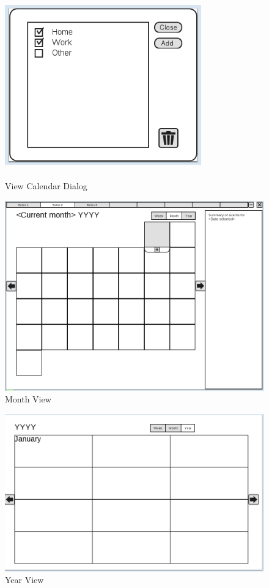 \documentclass{article}
\begin{document}
\begin{figure}
\centering
\includegraphics[height=8cm,width=8.5cm]{CMCLGDRViewCalendar.png}
\caption{View Calendar Dialog}
\label{fig:viewcal}
\end{figure}

\begin{figure}
\centering
\includegraphics[scale=0.5,angle=90]{CMCLGDRMonth.png}
\caption{Month View}
\label{fig:monthview}
\end{figure}

\begin{figure}
\centering
\includegraphics[scale=0.5,angle=90]{CMCLGDRYear.png}
\caption{Year View}
\label{fig:yearrview}
\end{figure}
\end{document}
